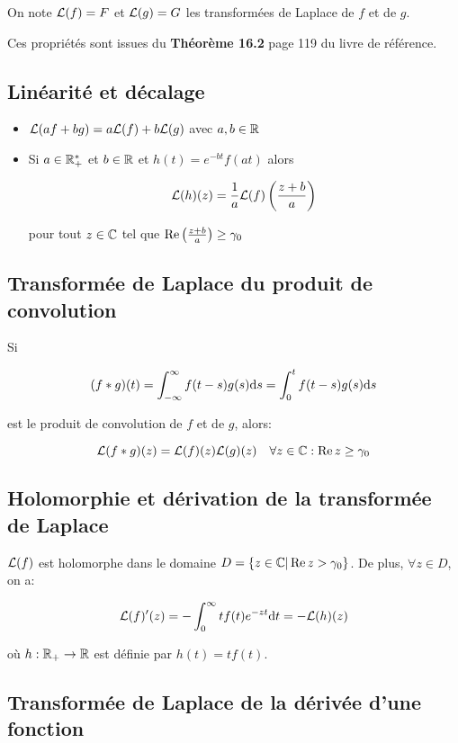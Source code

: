 On note $\mathcal{L}(f) = F$ et $\mathcal{L}(g) = G$ les transformées de Laplace de $f$ et de $g$.

\begin{note}
    Ces propriétés sont issues du \textbf{Théorème 16.2} page 119 du livre de référence.
\end{note}

\subsection{Linéarité et décalage}

\begin{itemize}
    \item 
    $\mathcal{L}(af + bg) = a \mathcal{L}(f) + b \mathcal{L}(g)$ avec $a, b \in \mathbb{R}$
    \item 
    Si $a \in \mathbb{R}_+^\ast$ et $b \in \mathbb{R}$ et $h(t) = e^{-bt} f(at)$ alors
    
    \[ \mathcal{L}(h)(z) = \frac{1}{a} \mathcal{L}(f)\left(\frac{z + b}{a}\right) \]
    
    pour tout $z \in \mathbb{C}$ tel que $\operatorname{Re}\left(\frac{z + b}{a}\right) \geq \gamma_0$
\end{itemize}

\subsection{Transformée de Laplace du produit de convolution}

Si

    \[
        (f \ast g)(t)
        = \int_{-\infty}^\infty f(t - s)g(s) \mathrm{d}s
        = \int_0^t f(t-s)g(s) \mathrm{d}s
    \]

est le produit de convolution de $f$ et de $g$, alors:

\[
    \mathcal{L}(f \ast g)(z) = \mathcal{L}(f)(z)\mathcal{L}(g)(z) \quad \forall z \in \mathbb{C} : \operatorname{Re} z \geq \gamma_0
\]

\subsection{Holomorphie et dérivation de la transformée de Laplace}

$\mathcal{L}(f)$ est holomorphe dans le domaine $D = \{ z \in \mathbb{C} | \operatorname{Re} z > \gamma_0 \}$.
De plus, $\forall z \in D$, on a:

\[ \mathcal{L}(f)'(z) = - \int_0^\infty t f(t) e^{-zt} \mathrm{d}t = - \mathcal{L}(h)(z) \]

où $h: \mathbb{R}_+ \rightarrow \mathbb{R}$ est définie par $h(t) = tf(t)$.

\subsection{Transformée de Laplace de la dérivée d'une fonction}

